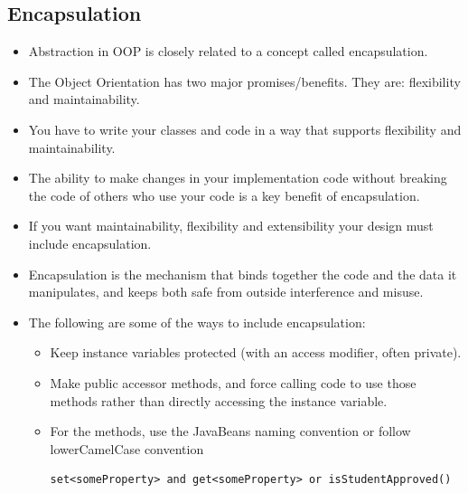 \documentclass[11pt,a4paper]{article}
\begin{document}
\subsection*{Encapsulation}
\begin{itemize}
\item Abstraction in OOP is closely related to a concept called encapsulation.
\item The Object Orientation has two major promises/benefits. They are: flexibility and maintainability.
\item You have to write your classes and code in a way that supports flexibility and maintainability.
\item The ability to make changes in your implementation code without breaking the code of others who use your code is a key benefit of encapsulation.
\item If you want maintainability, flexibility and extensibility your design must include encapsulation.
\item Encapsulation is the mechanism that binds together the code and the data it manipulates, and keeps both safe from outside interference and misuse.
\item The following are some of the ways to include encapsulation:
\begin{itemize}
\item Keep instance variables protected (with an access modifier, often private).
\item Make public accessor methods, and force calling code to use those methods rather than directly accessing the instance variable.
\item For the methods, use the JavaBeans naming convention or follow lowerCamelCase convention 
\begin{lstlisting}[numbers=none, xleftmargin=.15in]
set<someProperty> and get<someProperty> or isStudentApproved()
\end{lstlisting} 
\end{itemize}


\end{itemize}
\end{document}
